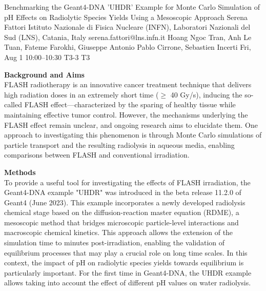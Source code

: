 \documentclass[12pt,lettersize,oneside]{book} %
\begin{document}
\begin{talk}
\end{talk}

\begin{talk}
  {Benchmarking the Geant4-DNA 'UHDR' Example for Monte Carlo Simulation of pH Effects on Radiolytic Species Yields Using a Mesoscopic Approach}%
  {Serena Fattori}%
  {Istituto Nazionale di Fisica Nucleare (INFN), Laboratori Nazionali del Sud (LNS), Catania, Italy}%
  {serena.fattori@lns.infn.it}%
  {Hoang Ngoc Tran, Anh Le Tuan, Fateme Farokhi, Giuseppe Antonio Pablo Cirrone, Sebastien Incerti}%
  {}%
  {Fri, Aug 1 10:00--10:30}%
  {T3-3}%
  {T3}%
  
    
   
\textbf{Background and Aims}\\
FLASH radiotherapy is an innovative cancer treatment technique that delivers high radiation doses in an extremely short time ($\geq$ 40 Gy/s), inducing the so-called FLASH effect—characterized by the sparing of healthy tissue while maintaining effective tumor control. However, the mechanisms underlying the FLASH effect remain unclear, and ongoing research aims to elucidate them. One approach to investigating this phenomenon is through Monte Carlo simulations of particle transport and the resulting radiolysis in aqueous media, enabling comparisons between FLASH and conventional irradiation.

\textbf{Methods}\\
To provide a useful tool for investigating the effects of FLASH irradiation, the Geant4-DNA example "UHDR" was introduced in the beta release 11.2.0 of Geant4 (June 2023). This example incorporates a newly developed radiolysis chemical stage based on the diffusion-reaction master equation (RDME), a mesoscopic method that bridges microscopic particle-level interactions and macroscopic chemical kinetics. This approach allows the extension of the simulation time to minutes post-irradiation, enabling the validation of equilibrium processes that may play a crucial role on long time scales. In this context, the impact of pH on radiolytic species yields towards equilibrium is particularly important. For the first time in Geant4-DNA, the UHDR example allows taking into account the effect of different pH values on water radiolysis.


\end{talk}
\end{document}

